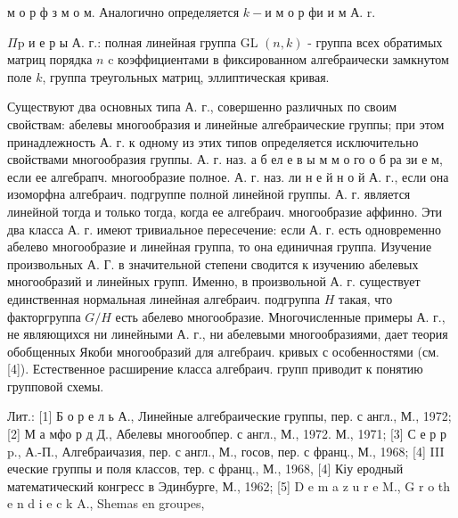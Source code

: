 \documentclass[10pt]{article}
\begin{document}
м о р ф з м о м. Аналогично определяется $k-и$ м о р фи и м А. r.



$\Pi \mathrm{p}$ и е р ы А. г.: полная линейная группа GL $(n, k)$ - группа всех обратимых матриц порядка $n$ c коэффициентами в фиксированном алгебраически замкнутом поле $k$, группа треугольных матриц, эллиптическая кривая.



Существуют два основных типа А. г., совершенно различных по своим свойствам: абелевы многообразия и линейные алгебраические группы; при этом принадлежность А. г. к одному из этих типов определяется исключительно свойствами многообразия группы. А. г. наз. а б ел е в ы м м о го о б ра зи е м, если ее алгебрапч. многообразие полное. А. г. наз. ли н е й н о й А. г., если она изоморфна алгебраич. подгруппе полной линейной группы. А. г. является линейной тогда и только тогда, когда ее алгебраич. многообразие аффинно. Эти два класса А. г. имеют тривиальное пересечение: если А. г. есть одновременно абелево многообразие и линейная группа, то она единичная группа. Изучение произвольных А. Г. в значительной степени сводится к изучению абелевых многообразий и линейных групп. Именно, в произвольной А. г. существует единственная нормальная линейная алгебраич. подгруппа $H$ такая, что факторгруппа $G / H$ есть абелево многообразие. Многочисленные примеры А. г., не являющихся ни линейными А. г., ни абелевыми многообразиями, дает теория обобщенных Якоби многообразий для алгебраич. кривых с особенностями (см. [4]). Естественное расширение класса алгебраич. групп приводит к понятию групповой схемы.



Лит.: [1] Б о р е л ь А., Линейные алгебраические группы, пер. с англ., М., 1972; [2] М а мфо р д Д., Абелевы многообпер. с англ., М., 1972. М., 1971; [3] С е р р $\mathrm{p}$., А.-П., Алгебраичазия, пер. с англ., М., госов, пер. с франц., М., 1968; [4] III еческие группы и поля классов, тер. с франц., М., 1968, [4] Кіу еродный математический конгресс в Эдинбурге, М., 1962; [5] D e m a z u r e M., G r o th e n d i e c k A., Shemas en groupes,
\end{document}
